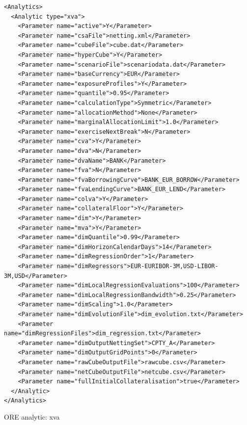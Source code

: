 \documentclass[12pt, a4paper]{article}
\begin{document}
\begin{listing}[H]
\begin{verbatim}
<Analytics>
  <Analytic type="xva">
    <Parameter name="active">Y</Parameter>
    <Parameter name="csaFile">netting.xml</Parameter>
    <Parameter name="cubeFile">cube.dat</Parameter>
    <Parameter name="hyperCube">Y</Parameter>
    <Parameter name="scenarioFile">scenariodata.dat</Parameter>
    <Parameter name="baseCurrency">EUR</Parameter>
    <Parameter name="exposureProfiles">Y</Parameter>
    <Parameter name="quantile">0.95</Parameter>
    <Parameter name="calculationType">Symmetric</Parameter>      
    <Parameter name="allocationMethod">None</Parameter>    
    <Parameter name="marginalAllocationLimit">1.0</Parameter>
    <Parameter name="exerciseNextBreak">N</Parameter>
    <Parameter name="cva">Y</Parameter>
    <Parameter name="dva">N</Parameter>
    <Parameter name="dvaName">BANK</Parameter>
    <Parameter name="fva">N</Parameter>
    <Parameter name="fvaBorrowingCurve">BANK_EUR_BORROW</Parameter>
    <Parameter name="fvaLendingCurve">BANK_EUR_LEND</Parameter>
    <Parameter name="colva">Y</Parameter>
    <Parameter name="collateralFloor">Y</Parameter>
    <Parameter name="dim">Y</Parameter>
    <Parameter name="mva">Y</Parameter>
    <Parameter name="dimQuantile">0.99</Parameter>
    <Parameter name="dimHorizonCalendarDays">14</Parameter>
    <Parameter name="dimRegressionOrder">1</Parameter>
    <Parameter name="dimRegressors">EUR-EURIBOR-3M,USD-LIBOR-3M,USD</Parameter>
    <Parameter name="dimLocalRegressionEvaluations">100</Parameter>
    <Parameter name="dimLocalRegressionBandwidth">0.25</Parameter>
    <Parameter name="dimScaling">1.0</Parameter>
    <Parameter name="dimEvolutionFile">dim_evolution.txt</Parameter>
    <Parameter name="dimRegressionFiles">dim_regression.txt</Parameter>
    <Parameter name="dimOutputNettingSet">CPTY_A</Parameter>      
    <Parameter name="dimOutputGridPoints">0</Parameter>
    <Parameter name="rawCubeOutputFile">rawcube.csv</Parameter>
    <Parameter name="netCubeOutputFile">netcube.csv</Parameter>
    <Parameter name="fullInitialCollateralisation">true</Parameter>
  </Analytic>
</Analytics>
\end{verbatim}
\caption{ORE analytic: xva}
\label{lst:ore_xva}
\end{listing}
\end{document}
